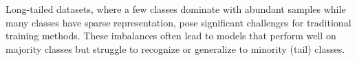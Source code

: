 Long-tailed datasets, where a few classes dominate with abundant samples while many classes have sparse representation, pose significant challenges for traditional training methods. These imbalances often lead to models that perform well on majority classes but struggle to recognize or generalize to minority (tail) classes.



